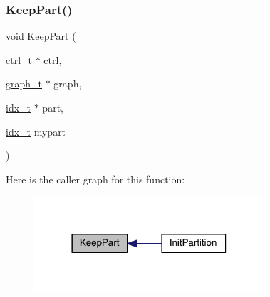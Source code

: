 \subsubsection{\texorpdfstring{Keep\+Part()}{KeepPart()}}
{\footnotesize\ttfamily void Keep\+Part (\begin{DoxyParamCaption}\item[{\hyperlink{a00742}{ctrl\+\_\+t} $\ast$}]{ctrl,  }\item[{\hyperlink{a00734}{graph\+\_\+t} $\ast$}]{graph,  }\item[{\hyperlink{a00876_aaa5262be3e700770163401acb0150f52}{idx\+\_\+t} $\ast$}]{part,  }\item[{\hyperlink{a00876_aaa5262be3e700770163401acb0150f52}{idx\+\_\+t}}]{mypart }\end{DoxyParamCaption})}

Here is the caller graph for this function\+:\nopagebreak
\begin{figure}[H]
\begin{center}
\leavevmode
\includegraphics[width=242pt]{a00906_a6986183d22bd650674c52d23db011f63_icgraph}
\end{center}
\end{figure}
